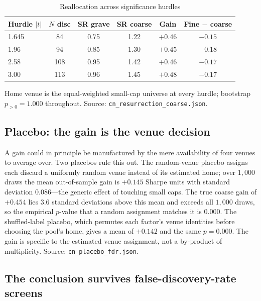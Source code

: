 \documentclass[12pt]{article}
\theoremstyle{plain}
\theoremstyle{definition}
\begin{document}
\begin{table}[t]
\centering
\caption{Reallocation across significance hurdles}
\label{tab:iahurdle}
\begin{threeparttable}
\begin{tabular}{lccccc}
\toprule
Hurdle $|t|$ & $N$ disc & SR grave & SR coarse & Gain & Fine $-$ coarse \\
\midrule
1.645 & 84  & 0.75 & 1.22 & $+0.46$ & $-0.15$ \\
1.96  & 94  & 0.85 & 1.30 & $+0.45$ & $-0.18$ \\
2.58  & 108 & 0.95 & 1.42 & $+0.46$ & $-0.17$ \\
3.00  & 113 & 0.96 & 1.45 & $+0.48$ & $-0.17$ \\
\bottomrule
\end{tabular}
\begin{tablenotes}\footnotesize
\item Home venue is the equal-weighted small-cap universe at every hurdle;
bootstrap $p_{>0}=1.000$ throughout. Source:
\texttt{cn\_resurrection\_coarse.json}.
\end{tablenotes}
\end{threeparttable}
\end{table}

\subsection{Placebo: the gain is the venue decision}

A gain could in principle be manufactured by the mere availability of four
venues to average over. Two placebos rule this out. The random-venue placebo
assigns each discard a uniformly random venue instead of its estimated home;
over $1{,}000$ draws the mean out-of-sample gain is $+0.145$ Sharpe units with
standard deviation $0.086$---the generic effect of touching small caps. The true
coarse gain of $+0.454$ lies $3.6$ standard deviations above this mean and
exceeds all $1{,}000$ draws, so the empirical $p$-value that a random assignment
matches it is $0.000$. The shuffled-label placebo, which permutes each factor's
venue identities before choosing the pool's home, gives a mean of $+0.142$ and
the same $p=0.000$. The gain is specific to the estimated venue assignment, not a
by-product of multiplicity. Source: \texttt{cn\_placebo\_fdr.json}.

\subsection{The conclusion survives false-discovery-rate screens}
\end{document}
